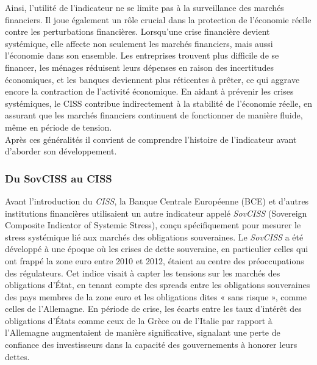 \begin{sloppypar}
Ainsi, l'utilité de l'indicateur ne se limite pas à la surveillance des marchés financiers. Il joue également un rôle crucial dans la protection de l'économie réelle contre les perturbations financières. Lorsqu'une crise financière devient systémique, elle affecte non seulement les marchés financiers, mais aussi l'économie dans son ensemble. Les entreprises trouvent plus difficile de se financer, les ménages réduisent leurs dépenses en raison des incertitudes économiques, et les banques deviennent plus réticentes à prêter, ce qui aggrave encore la contraction de l'activité économique. En aidant à prévenir les crises systémiques, le CISS contribue indirectement à la stabilité de l'économie réelle, en assurant que les marchés financiers continuent de fonctionner de manière fluide, même en période de tension.\\ 

Après ces généralités il convient de comprendre l'histoire de l'indicateur avant d'aborder son développement.

\subsubsection{Du SovCISS au CISS}

Avant l'introduction du \textit{CISS}, la Banque Centrale Européenne (BCE) et d'autres institutions financières utilisaient un autre indicateur appelé \textit{SovCISS} (Sovereign Composite Indicator of Systemic Stress), conçu spécifiquement pour mesurer le stress systémique lié aux marchés des obligations souveraines. Le \textit{SovCISS} a été développé à une époque où les crises de dette souveraine, en particulier celles qui ont frappé la zone euro entre 2010 et 2012, étaient au centre des préoccupations des régulateurs. Cet indice visait à capter les tensions sur les marchés des obligations d'État, en tenant compte des spreads entre les obligations souveraines des pays membres de la zone euro et les obligations dites « sans risque », comme celles de l'Allemagne. En période de crise, les écarts entre les taux d’intérêt des obligations d’États comme ceux de la Grèce ou de l’Italie par rapport à l’Allemagne augmentaient de manière significative, signalant une perte de confiance des investisseurs dans la capacité des gouvernements à honorer leurs dettes.\\


\end{sloppypar}
